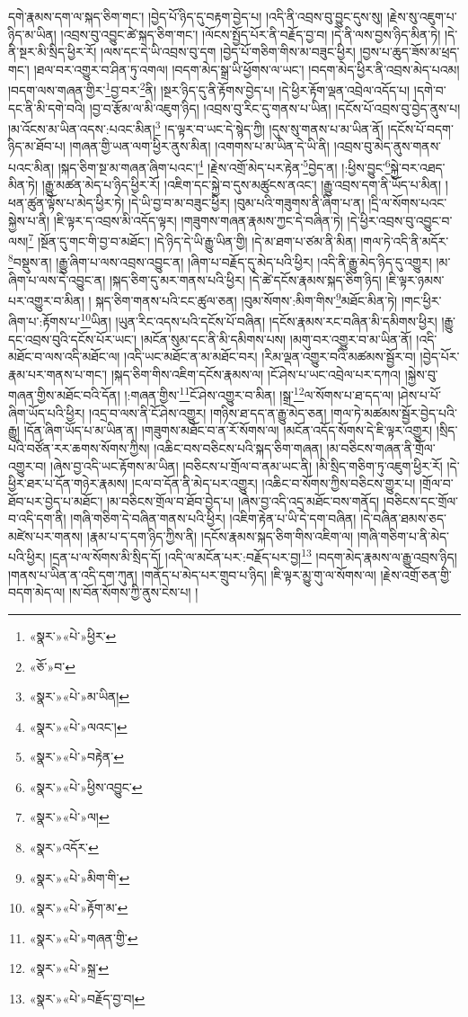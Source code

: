 དགེ་རྣམས་དག་ལ་སྐད་ཅིག་གང་། །བྱེད་པོ་ཉིད་དུ་བརྟག་བྱེད་པ། །འདི་ནི་འབྲས་བུ་བྱུང་དུས་སུ། །རྗེས་སུ་འཇུག་པ་ཉིད་མ་ཡིན། །འབྲས་བུ་འབྱུང་ཚེ་སྐད་ཅིག་གང་། །ལོངས་སྤྱོད་པོར་ནི་བརྗོད་བྱ་བ། །དེ་ནི་ལས་བྱས་ཉིད་མིན་ཏེ། །དེ་ནི་སྔར་མི་སྲིད་ཕྱིར་རོ། །ལས་དང་དེ་ཡི་འབྲས་བུ་དག །བྱེད་པོ་གཅིག་གིས་མ་བཟུང་ཕྱིར། །བྱས་པ་ཆུད་ཟོས་མ་ཕྲད་གང་། །ཐལ་བར་འགྱུར་བ་ཤིན་ཏུ་འགལ། །བདག་མེད་སྒྲ་ཡི་ཕྱོགས་ལ་ཡང་། །བདག་མེད་ཕྱིར་ནི་འབྲས་མེད་པའམ། །བདག་ལས་གཞན་གྱིར་\footnote{«སྣར་»«པེ་»ཕྱིར་}བྱ་བར་\footnote{«ཅོ་»བ་}ནི། །སྔར་ཉིད་དུ་ནི་རྟོགས་བྱེད་པ། །དེ་ཕྱིར་རྟོག་ལྡན་འབྲེལ་འདོད་པ། །དགེ་བ་དང་ནི་མི་དགེ་བའི། །བྱ་བ་རྩོམ་ལ་མི་འཇུག་ཉིད། །འབྲས་བུ་རིང་དུ་གནས་པ་ཡིན། །དངོས་པོ་འབྲས་བུ་བྱེད་ནུས་པ། །མ་འོངས་མ་ཡིན་འདས་:པའང་མིན།\footnote{«སྣར་»«པེ་»མ་ཡིན།} །ད་ལྟར་བ་ཡང་དེ་སྙེད་ཀྱི། །དུས་སུ་གནས་པ་མ་ཡིན་ནོ། །དངོས་པོ་བདག་ཉིད་མ་ཐོབ་པ། །གཞན་གྱི་ཡན་ལག་ཕྱིར་ནུས་མིན། །འགགས་པ་མ་ཡིན་དེ་ཡི་ནི། །འབྲས་བུ་མེད་ནུས་གནས་པའང་མིན། །སྐད་ཅིག་སྔ་མ་གཞན་ཞིག་པའང་།\footnote{«སྣར་»«པེ་»ལའང་།} །རྗེས་འགྲོ་མེད་པར་རྟེན་\footnote{«སྣར་»«པེ་»བརྟེན་}བྱེད་ན། །:ཕྱིས་བྱུང་\footnote{«སྣར་»«པེ་»ཕྱིས་འབྱུང་}སྐྱེ་བར་འཐད་མིན་ཏེ། །རྒྱུ་མཚན་མེད་པ་ཉིད་ཕྱིར་རོ། །འཇིག་དང་སྐྱེ་བ་དུས་མཚུངས་ནའང་། །རྒྱུ་འབྲས་དག་ནི་ཡོད་པ་མིན། །ཕན་ཚུན་ལྟོས་པ་མེད་ཕྱིར་ཏེ། །དེ་ཡི་བྱ་བ་མ་བཟུང་ཕྱིར། །བུམ་པའི་གཟུགས་ནི་ཞིག་པ་ན། །དྲི་ལ་སོགས་པའང་སྐྱེས་པ་ནི། །ཇི་ལྟར་ད་འབྲས་མི་འདོད་ལྟར། །གཟུགས་གཞན་རྣམས་ཀྱང་དེ་བཞིན་ཏེ། །དེ་ཕྱིར་འབྲས་བུ་འབྱུང་བ་ལས།\footnote{«སྣར་»«པེ་»ལ།} །སྔོན་དུ་གང་གི་བྱ་བ་མཐོང་། །དེ་ཉིད་དེ་ཡི་རྒྱུ་ཡིན་གྱི། །དེ་མ་ཐག་པ་ཙམ་ནི་མིན། །གལ་ཏེ་འདི་ནི་མདོར་\footnote{«སྣར་»འདོར་}བསྡུས་ན། །རྒྱུ་ཞིག་པ་ལས་འབྲས་འབྱུང་ན། །ཞིག་པ་བརྗོད་དུ་མེད་པའི་ཕྱིར། །འདི་ནི་རྒྱུ་མེད་ཉིད་དུ་འགྱུར། །མ་ཞིག་པ་ལས་དེ་འབྱུང་ན། །སྐད་ཅིག་དུ་མར་གནས་པའི་ཕྱིར། །དེ་ཚེ་དངོས་རྣམས་སྐད་ཅིག་ཉིད། །ཇི་ལྟར་ཉམས་པར་འགྱུར་བ་མིན། །
སྐད་ཅིག་གནས་པའི་ངང་ཚུལ་ཅན། །བུམ་སོགས་:མིག་གིས་\footnote{«སྣར་»«པེ་»མིག་གི་}མཐོང་མིན་ཏེ། །གང་ཕྱིར་ཞིག་པ་:རྟོགས་པ་\footnote{«སྣར་»«པེ་»རྟོག་མ་}ཡིན། །ཡུན་རིང་འདས་པའི་དངོས་པོ་བཞིན། །དངོས་རྣམས་རང་བཞིན་མི་དམིགས་ཕྱིར། །རྒྱུ་དང་འབྲས་བུའི་དངོས་པོར་ཡང་། །མངོན་སུམ་དང་ནི་མི་དམིགས་པས། །མགུ་བར་འགྱུར་བ་མ་ཡིན་ནོ། །འདི་མཐོང་བ་ལས་འདི་མཐོང་ལ། །འདི་ཡང་མཐོང་ན་མ་མཐོང་བར། །རིམ་ལྡན་འགྱུར་བའི་མཚམས་སྦྱོར་བ། །བྱེད་པོར་རྣམ་པར་གནས་པ་གང་། །སྐད་ཅིག་གིས་འཇིག་དངོས་རྣམས་ལ། །ངོ་ཤེས་པ་ཡང་འབྲེལ་པར་དཀའ། །སྐྱེས་བུ་གཞན་གྱིས་མཐོང་བའི་དོན། །:གཞན་གྱིས་\footnote{«སྣར་»«པེ་»གཞན་གྱི་}ངོ་ཤེས་འགྱུར་བ་མིན། །སྒྲ་\footnote{«སྣར་»«པེ་»སྐྲ་}ལ་སོགས་པ་ཐ་དད་ལ། །ཤེས་པ་པོ་ཞིག་ཡོད་པའི་ཕྱིར། །འདྲ་བ་ལས་ནི་ངོ་ཤེས་འགྱུར། །གཉིས་ཐ་དད་ན་རྒྱུ་མེད་ཅན། །གལ་ཏེ་མཚམས་སྦྱོར་བྱེད་པའི་རྒྱུ། །དོན་ཞིག་ཡོད་པ་མ་ཡིན་ན། །གཟུགས་མཐོང་བ་ན་རོ་སོགས་ལ། །མངོན་འདོད་སོགས་དེ་ཇི་ལྟར་འགྱུར། །སྲིད་པའི་བཙོན་རར་ཆགས་སོགས་ཀྱིས། །འཆིང་བས་བཅིངས་པའི་སྐད་ཅིག་གཞན། །མ་བཅིངས་གཞན་ནི་གྲོལ་འགྱུར་བ། །ཞེས་བྱ་འདི་ཡང་རྟོགས་མ་ཡིན། །བཅིངས་པ་གྲོལ་བ་ནམ་ཡང་ནི། །མི་སྲིད་གཅིག་ཏུ་འཇུག་ཕྱིར་རོ། །དེ་ཕྱིར་ཐར་པ་དོན་གཉེར་རྣམས། །ངལ་བ་དོན་ནི་མེད་པར་འགྱུར། །འཆིང་བ་སོགས་ཀྱིས་བཅིངས་གྱུར་པ། །གྲོལ་བ་ཐོབ་པར་བྱེད་པ་མཐོང་། །མ་བཅིངས་གྲོལ་བ་ཐོབ་བྱེད་པ། །ཞེས་བྱ་འདི་འདྲ་མཐོང་བས་གནོད། །བཅིངས་དང་གྲོལ་བ་འདི་དག་ནི། །གཞི་གཅིག་དེ་བཞིན་གནས་པའི་ཕྱིར། །འཇིག་རྟེན་པ་ཡི་དེ་དག་བཞིན། །དེ་བཞིན་ཐམས་ཅད་མཛེས་པར་གནས། །རྣམ་པ་ད་དག་ཉིད་ཀྱིས་ནི། །དངོས་རྣམས་སྐད་ཅིག་གིས་འཇིག་ལ། །གཞི་གཅིག་པ་ནི་མེད་པའི་ཕྱིར། །དྲན་པ་ལ་སོགས་མི་སྲིད་དོ། །འདི་ལ་མངོན་པར་:བརྗོད་པར་བྱ།\footnote{«སྣར་»«པེ་»བརྗོད་བྱ་བ།} །བདག་མེད་རྣམས་ལ་རྒྱུ་འབྲས་ཉིད། །གནས་པ་ཡིན་ན་འདི་དག་ཀུན། །གནོད་པ་མེད་པར་གྲུབ་པ་ཉིད། །ཇི་ལྟར་མྱུ་གུ་ལ་སོགས་ལ། །རྗེས་འགྲོ་ཅན་གྱི་བདག་མེད་ལ། །ས་བོན་སོགས་ཀྱི་ནུས་ངེས་པ། །
